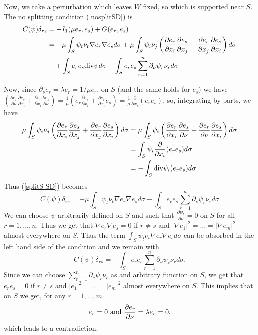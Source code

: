\documentclass[a4paper,reqno,11pt,oneside]{amsart}
\theoremstyle{plain}
\theoremstyle{plain}
\theoremstyle{plain}
\theoremstyle{remark}
\def\div{\textup{div}}
\begin{document}
Now, we take a perturbation which leaves $W$ fixed, so which is supported near $S$. 
The no splitting condition (\ref{nosplitSD}) is 
 \begin{equation} \begin{aligned}\label{splitS-SD}
    C(\psi)\delta_{rs}&=
    -I_1(\mu e_r,e_s)
+G( e_r,e_s) \\ &=
-\mu \int_{S}\psi_t\nu_t \nabla e_r\nabla e_s d\sigma
    +\mu \int_{S}
\psi_i\nu_j\left(\frac{\partial e_r}{\partial x_i}\frac{\partial e_s}{\partial x_j}+\frac{\partial e_r}{\partial x_j}\frac{\partial e_s}{\partial x_i}
\right) d\sigma\\ &\quad
+ \int_{ S}  e_r  e_s \div \psi d\sigma - \int_{ S}  e_r  e_s\sum_{r=1}^n \partial_\nu \psi_r \nu_r d\sigma
 \end{aligned}\end{equation}

Now, since $\partial_\nu e_r=\lambda e_r=1/\mu e_r$, on $S$ (and the same holds for $e_s$)  we have $\left(\frac{\partial e_r}{\partial \nu}\frac{\partial e_s}{\partial x_i}+\frac{\partial e_r}{\partial x_i}\frac{\partial e_s}{\partial \nu}
\right)=\frac1\mu\left( e_r\frac{\partial e_s}{\partial x_i}+\frac{\partial e_r}{\partial x_i} e_s
\right)=\frac1\mu\frac{\partial }{\partial x_i}(e_r e_s)$, so, integrating by parts, 
we have
$$ \begin{aligned}
\mu \int_{S}
\psi_i\nu_j\left(\frac{\partial e_r}{\partial x_i}\frac{\partial e_s}{\partial x_j}+\frac{\partial e_r}{\partial x_j}\frac{\partial e_s}{\partial x_i}
\right) d\sigma  &
=\mu \int_{S}
\psi_i\left(\frac{\partial e_r}{\partial x_i}\frac{\partial e_s}{\partial \nu}+\frac{\partial e_r}{\partial \nu}\frac{\partial e_s}{\partial x_i}
\right) d\sigma\\ &
=\int_{S}  
\psi_i \frac{\partial }{\partial x_i}(e_r e_s)
d\sigma\\ &=-\int_{S}  
\div\psi_i  (e_r e_s)
d\sigma
 \end{aligned}$$
Thus (\ref{splitS-SD}) becomes
$$
     C(\psi)\delta_{rs}=-\mu \int_{S}\psi_t\nu_t \nabla e_r\nabla e_s d\sigma
     - \int_{ S}  e_r  e_s\sum_{r=1}^n \partial_\nu \psi_r \nu_r d\sigma
$$
We can choose $\psi$ arbitrarily defined on $S$ and such that $\frac{\partial \psi_r} {\partial \nu}=0$ on $S$ for all $r=1,\dots,n$. Thus we get that  $\nabla e_r \nabla e_s=0$ if $r\neq s$ and $|\nabla e_1|^2=\dots=|\nabla e_m|^2$ almost everywhere on $S$. Thus the term $\int_{S}\psi_t\nu_t \nabla e_r\nabla e_s d\sigma$ can be absorbed in the left hand side of the condition and we remain with
$$
     C(\psi)\delta_{rs}=
     - \int_{ S}  e_r  e_s\sum_{r=1}^n \partial_\nu \psi_r \nu_r d\sigma
.$$
Since we can choose $\sum_{r=1}^n \partial_\nu \psi_r \nu_r $ as and arbitrary function on $S$, we get that $ e_r  e_s=0$ if $r\neq s$ and $| e_1|^2=\dots=| e_m|^2$ almost everywhere on $S$. This implies that on $S$ we get, for any $r=1,\dots, m$
$$
    e_r=0\ \hbox{and}\  \frac{\partial e_r}{\partial \nu}=\lambda e_r=0
,$$
which leads to a contradiction.
\end{document}

